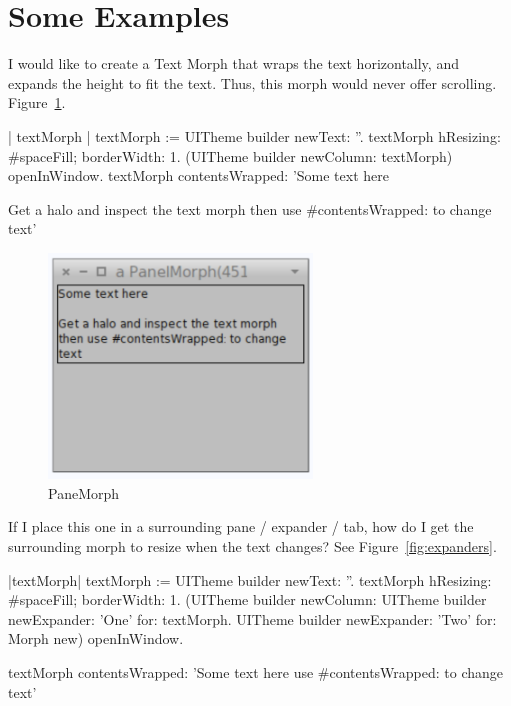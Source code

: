 \documentclass[a4paper,10pt,twoside]{book}
\begin{document}
\newpage
\section{Some Examples}


I would like to create a Text Morph that wraps the text horizontally, and expands the height to fit the text. Thus, this morph would never offer scrolling. Figure~\ref{fig:paneMorph}.


\begin{code}{}
| textMorph |
textMorph := UITheme builder newText: ''.
textMorph
    hResizing: #spaceFill;
    borderWidth: 1.
(UITheme builder newColumn: {textMorph}) openInWindow.
textMorph contentsWrapped: 'Some text here

Get a halo and inspect the text morph
then use #contentsWrapped: to change text'
\end{code}

\begin{figure}[ht]\centering
	\includegraphics[width=7cm]{paneMorph}
	\caption{PaneMorph}
	\label{fig:paneMorph}
\end{figure}


If I place this one in a surrounding pane / expander / tab, how do I get the surrounding morph to resize when the text changes? See Figure~\ref{fig:expanders}.

\begin{code}{}
|textMorph|
textMorph := UITheme builder newText: ''.
textMorph
    hResizing: #spaceFill;
    borderWidth: 1.
(UITheme builder newColumn: {
    UITheme builder newExpander: 'One' for: textMorph.
    UITheme builder newExpander: 'Two' for: Morph new}) openInWindow.

textMorph contentsWrapped: 'Some text here
use #contentsWrapped: to change text'
\end{code}
\end{document}
